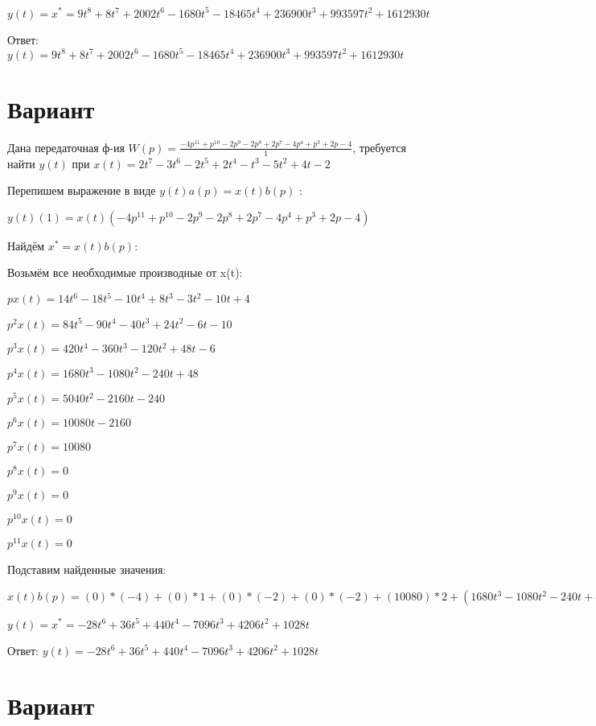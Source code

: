 \documentclass{article}
\begin{document}
$y(t)=x^*=9t^{8}+8t^{7}+2002t^{6}-1680t^{5}-18465t^{4}+236900t^{3}+993597t^{2}+1612930t$

Ответ: $y(t) = 9t^{8}+8t^{7}+2002t^{6}-1680t^{5}-18465t^{4}+236900t^{3}+993597t^{2}+1612930t$

\section{Вариант}

Дана передаточная ф-ия $W(p)=\frac{-4p^{11}+p^{10}-2p^{9}-2p^{8}+2p^{7}-4p^{4}+p^{3}+2p-4}{1}$, требуется найти $y(t)$ при $x(t)=2t^{7}-3t^{6}-2t^{5}+2t^{4}-t^{3}-5t^{2}+4t-2$

Перепишем выражение в виде $y(t)a(p)=x(t)b(p)$ :

$y(t)(1)=x(t)(-4p^{11}+p^{10}-2p^{9}-2p^{8}+2p^{7}-4p^{4}+p^{3}+2p-4)$

Найдём $x^*=x(t)b(p)$:

Возьмём все необходимые производные от x(t):

$px(t)=14t^{6}-18t^{5}-10t^{4}+8t^{3}-3t^{2}-10t+4$

$p^2x(t)=84t^{5}-90t^{4}-40t^{3}+24t^{2}-6t-10$

$p^3x(t)=420t^{4}-360t^{3}-120t^{2}+48t-6$

$p^4x(t)=1680t^{3}-1080t^{2}-240t+48$

$p^5x(t)=5040t^{2}-2160t-240$

$p^6x(t)=10080t-2160$

$p^7x(t)=10080$

$p^8x(t)=0$

$p^9x(t)=0$

$p^10x(t)=0$

$p^11x(t)=0$

Подставим найденные значения:

$x(t)b(p) = (0)*(-4)+(0)*1+(0)*(-2)+(0)*(-2)+(10080)*2+(1680t^{3}-1080t^{2}-240t+48)*(-4)+(420t^{4}-360t^{3}-120t^{2}+48t-6)*1+(14t^{6}-18t^{5}-10t^{4}+8t^{3}-3t^{2}-10t+4)*2+(14t^{6}-18t^{5}-10t^{4}+8t^{3}-3t^{2}-10t+4)*(-4)=-28t^{6}+36t^{5}+440t^{4}-7096t^{3}+4206t^{2}+1028t$





$y(t)=x^*=-28t^{6}+36t^{5}+440t^{4}-7096t^{3}+4206t^{2}+1028t$

Ответ: $y(t) = -28t^{6}+36t^{5}+440t^{4}-7096t^{3}+4206t^{2}+1028t$

\section{Вариант}
\end{document}

